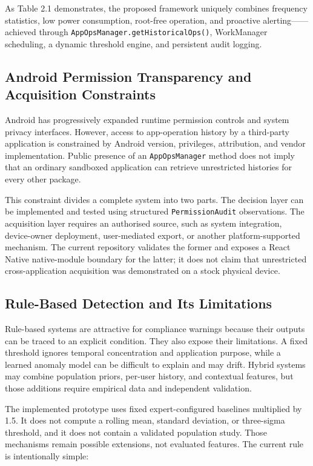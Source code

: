 As Table 2.1 demonstrates, the proposed framework uniquely combines frequency statistics, low power consumption, root-free operation, and proactive alerting——achieved through \texttt{AppOpsManager.getHistoricalOps()}, WorkManager scheduling, a dynamic threshold engine, and persistent audit logging.

\subsection{Android Permission Transparency and Acquisition Constraints}

Android has progressively expanded runtime permission controls and system privacy interfaces. However, access to app-operation history by a third-party application is constrained by Android version, privileges, attribution, and vendor implementation. Public presence of an \texttt{AppOpsManager} method does not imply that an ordinary sandboxed application can retrieve unrestricted histories for every other package.

This constraint divides a complete system into two parts. The decision layer can be implemented and tested using structured \texttt{PermissionAudit} observations. The acquisition layer requires an authorised source, such as system integration, device-owner deployment, user-mediated export, or another platform-supported mechanism. The current repository validates the former and exposes a React Native native-module boundary for the latter; it does not claim that unrestricted cross-application acquisition was demonstrated on a stock physical device.

\subsection{Rule-Based Detection and Its Limitations}

Rule-based systems are attractive for compliance warnings because their outputs can be traced to an explicit condition. They also expose their limitations. A fixed threshold ignores temporal concentration and application purpose, while a learned anomaly model can be difficult to explain and may drift. Hybrid systems may combine population priors, per-user history, and contextual features, but those additions require empirical data and independent validation.

The implemented prototype uses fixed expert-configured baselines multiplied by 1.5. It does not compute a rolling mean, standard deviation, or three-sigma threshold, and it does not contain a validated population study. Those mechanisms remain possible extensions, not evaluated features. The current rule is intentionally simple:

